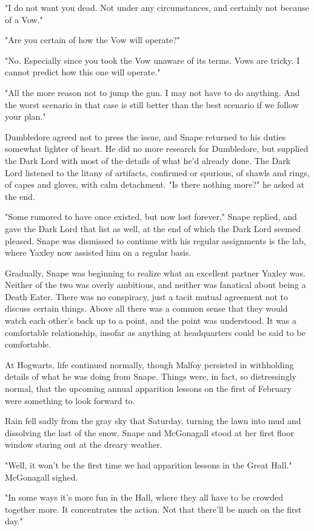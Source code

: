 \documentclass[a4paper,11pt]{article}
\begin{document}
"I do not want you dead. Not under any circumstances, and certainly not because of a Vow."

"Are you certain of how the Vow will operate?"

"No. Especially since you took the Vow unaware of its terms. Vows are tricky. I cannot predict how this one will operate."

"All the more reason not to jump the gun. I may not have to do anything. And the worst scenario in that case is still better than the best scenario if we follow your plan."

Dumbledore agreed not to press the issue, and Snape returned to his duties somewhat lighter of heart. He did no more research for Dumbledore, but supplied the Dark Lord with most of the details of what he'd already done. The Dark Lord listened to the litany of artifacts, confirmed or spurious, of shawls and rings, of capes and gloves, with calm detachment. "Is there nothing more?" he asked at the end.

"Some rumored to have once existed, but now lost forever," Snape replied, and gave the Dark Lord that list as well, at the end of which the Dark Lord seemed pleased. Snape was dismissed to continue with his regular assignments is the lab, where Yaxley now assisted him on a regular basis.

Gradually, Snape was beginning to realize what an excellent partner Yaxley was. Neither of the two was overly ambitious, and neither was fanatical about being a Death Eater. There was no conspiracy, just a tacit mutual agreement not to discuss certain things. Above all there was a common sense that they would watch each other's back up to a point, and the point was understood. It was a comfortable relationship, insofar as anything at headquarters could be said to be comfortable.

At Hogwarts, life continued normally, though Malfoy persisted in withholding details of what he was doing from Snape. Things were, in fact, so distressingly normal, that the upcoming annual apparition lessons on the first of February were something to look forward to.

Rain fell sadly from the gray sky that Saturday, turning the lawn into mud and dissolving the last of the snow. Snape and McGonagall stood at her first floor window staring out at the dreary weather.

"Well, it won't be the first time we had apparition lessons in the Great Hall." McGonagall sighed.

"In some ways it's more fun in the Hall, where they all have to be crowded together more. It concentrates the action. Not that there'll be much on the first day."
\end{document}
